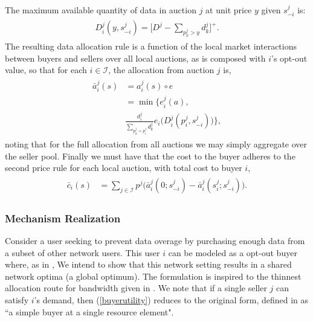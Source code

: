 \documentclass[12pt]{article}
\theoremstyle{definition}
\newcommand{\vs}{\varsigma}
\newcommand{\mcI}{\mathcal{I}}
\begin{document}
\begin{multicols}{2}
The maximum available quantity of data in auction
$j$ at unit price $y$ given $s_{-i}^j$ is: 
\begin{align}
\begin{split}\label{datacomposed}
    D_i^j(y,s_{-i}^j) = \bigg\lbrack D^j - \sum_{p_k^j> y} d_k^j\bigg\rbrack^+.
\end{split}
\end{align}
The resulting data allocation rule is a function of the local market
interactions between buyers and sellers over all local auctions, as is composed with $i$'s opt-out value, so that for each $i \in \mcI$, the
allocation from auction $j$ is,
\begin{align}\label{dataallocation}
\begin{split}
    \bar{a}_i^j(s) &= a_i^j(s) \circ e \\
    &= \min\bigg\lbrace e_i^j(a), \\
    &\frac{d_i^j}{\sum_{p_k^j= p_i^j}d_k^j} e_i \big(
D_i^j(p_i^j,s_{-i}^j)\big)\bigg\rbrace,
\end{split}
\end{align}
noting that for the full allocation from all auctions we may simply aggregate
over the seller pool.
Finally we must have that the cost to the buyer adheres to the second price
rule for each local auction, with total cost to buyer $i$,
\begin{align}\label{datacost}
\begin{split}
    \bar{c}_i(s) &= \displaystyle\sum_{j\in\mcI} 
p^j \bigg(\bar{a}_i^j(0; s_{-i}^j)
    -\bar{a}_i^j(s_i^j;s_{-i}^j)\bigg).
\end{split}
\end{align}

\subsubsection{Mechanism Realization}\label{realization}

Consider a user seeking to prevent
data overage by purchasing enough data from a subset of other network users.
This user $i$ can be modeled as a opt-out buyer where, as in \cite{semret},
We intend to show that this network setting results in a shared network optima (a
global optimum). The formulation is inspired to the thinnest allocation route for
bandwidth given in \cite{lazar}. We note that if a single seller $j$ can
satisfy $i$'s demand, then
(\ref{buyerutility}) reduces to the original form, defined in
\cite{semret} as ``a simple buyer at a single resource element".


\end{multicols}
\end{document}
